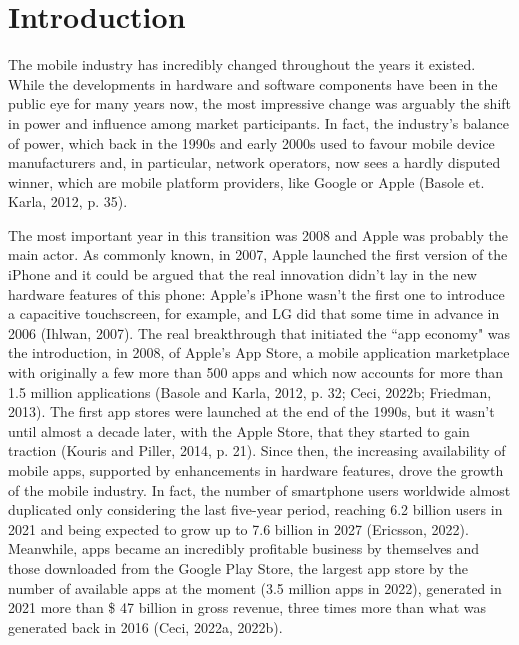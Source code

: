

\chapter{Introduction}
\label{introduction}
\thispagestyle{empty}


The mobile industry has incredibly changed throughout the years it existed. While the developments in hardware and software components have been in the public eye for many years now, the most impressive change was arguably the shift in power and influence among market participants. 
In fact, the industry's balance of power, which back in the 1990s and early 2000s used to favour mobile device manufacturers and, in particular, network operators, now sees a hardly disputed winner, which are mobile platform providers, like Google or Apple (Basole et. Karla, 2012, p. 35).

The most important year in this transition was 2008 and Apple was probably the main actor. As commonly known, in 2007, Apple launched the first version of the iPhone and it could be argued that the real innovation didn't lay in the new hardware features of this phone: Apple's iPhone wasn't the first one to introduce a capacitive touchscreen, for example, and LG did that some time in advance in 2006 (Ihlwan, 2007). The real breakthrough that initiated the ``app economy" was the introduction, in 2008, of Apple's App Store, a mobile application marketplace with originally a few more than 500 apps and which now accounts for more than 1.5 million applications (Basole and Karla, 2012, p. 32; Ceci, 2022b; Friedman, 2013). The first app stores were launched at the end of the 1990s, but it wasn't until almost a decade later, with the Apple Store, that they started to gain traction (Kouris and Piller, 2014, p. 21). Since then, the increasing availability of mobile apps, supported by enhancements in hardware features, drove the growth of the mobile industry. In fact, the number of smartphone users worldwide almost duplicated only considering the last five-year period, reaching 6.2 billion users in 2021 and being expected to grow up to 7.6 billion in 2027 (Ericsson, 2022). Meanwhile, apps became an incredibly profitable business by themselves and those downloaded from the Google Play Store, the largest app store by the number of available apps at the moment (3.5 million apps in 2022), generated in 2021 more than \$ 47 billion in gross revenue, three times more than what was generated back in 2016 (Ceci, 2022a, 2022b). 

